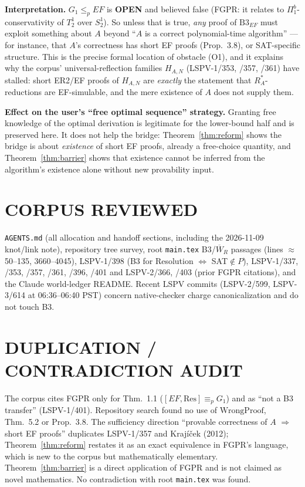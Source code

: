 \documentclass[11pt]{article}
\theoremstyle{definition}
\begin{document}
\noindent\textbf{Interpretation.} $G_1\le_p EF$ is \textbf{OPEN} and believed false (FGPR: it relates to $\Pi^b_1$-conservativity of $T^1_2$ over $S^1_2$). So unless that is true, \emph{any} proof of $\mathrm{B3}_{EF}$ must exploit something about $A$ beyond ``$A$ is a correct polynomial-time algorithm'' --- for instance, that $A$'s correctness has short EF proofs (Prop.~3.8), or SAT-specific structure. This is the precise formal location of obstacle (O1), and it explains why the corpus' universal-reflection families $H_{A,N}$ (LSPV-1/353, /357, /361) have stalled: short ER2/EF proofs of $H_{A,N}$ are \emph{exactly} the statement that $R^\ast_A$-reductions are EF-simulable, and the mere existence of $A$ does not supply them.

\noindent\textbf{Effect on the user's ``free optimal sequence'' strategy.} Granting free knowledge of the optimal derivation is legitimate for the lower-bound half and is preserved here. It does not help the bridge: Theorem~\ref{thm:reform} shows the bridge is about \emph{existence} of short EF proofs, already a free-choice quantity, and Theorem~\ref{thm:barrier} shows that existence cannot be inferred from the algorithm's existence alone without new provability input.

\section*{CORPUS REVIEWED}
\texttt{AGENTS.md} (all allocation and handoff sections, including the 2026-11-09 knot/link note), repository tree survey, root \texttt{main.tex} B3/$\overline W_R$ passages (lines $\approx$50--135, 3660--4045), LSPV-1/398 (B3 for Resolution $\iff$ SAT$\notin P$), LSPV-1/337, /353, /357, /361, /396, /401 and LSPV-2/366, /403 (prior FGPR citations), and the Claude world-ledger README. Recent LSPV commits (LSPV-2/599, LSPV-3/614 at 06:36--06:40 PST) concern native-checker charge canonicalization and do not touch B3.

\section*{DUPLICATION / CONTRADICTION AUDIT}
The corpus cites FGPR only for Thm.~1.1 ($[EF,\mathrm{Res}]\equiv_p G_1$) and as ``not a B3 transfer'' (LSPV-1/401). Repository search found no use of $\mathrm{WrongProof}$, Thm.~5.2 or Prop.~3.8. The sufficiency direction ``provable correctness of $A$ $\Rightarrow$ short EF proofs'' duplicates LSPV-1/357 and Krajíček (2012); Theorem~\ref{thm:reform} restates it as an exact equivalence in FGPR's language, which is new to the corpus but mathematically elementary. Theorem~\ref{thm:barrier} is a direct application of FGPR and is not claimed as novel mathematics. No contradiction with root \texttt{main.tex} was found.
\end{document}
